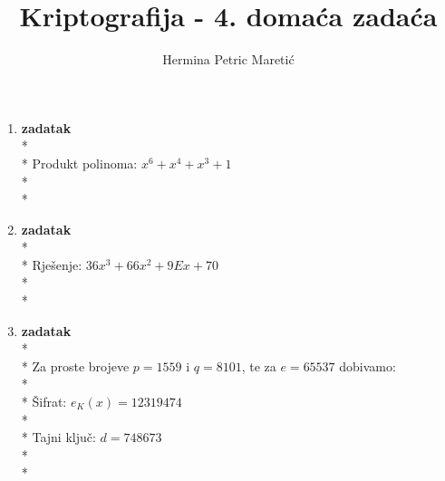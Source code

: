 \documentclass[11pt]{article} %
\title{Kriptografija - 4. domaća zadaća}
\author{Hermina Petric Maretić}
\begin{document}
\maketitle

\begin{enumerate}
\item \textbf{zadatak}
\\*
\\*
Produkt polinoma: $ x^6+x^4+x^3+1 $
\\*
\\*
\item \textbf{zadatak}
\\*
\\*
Rješenje: $36 x^3 + 66 x^2 + 9E x + 70$
\\*
\\*
\item \textbf{zadatak}
\\*
\\*
Za proste brojeve $p=1559$ i $q=8101$, te za $e=65537$ dobivamo:\\*
\\*
Šifrat: $e_{K}(x) = 12319474$ \\*
\\*
Tajni ključ: $d=748673$\\*
\\*

\end{enumerate}
\end{document}
